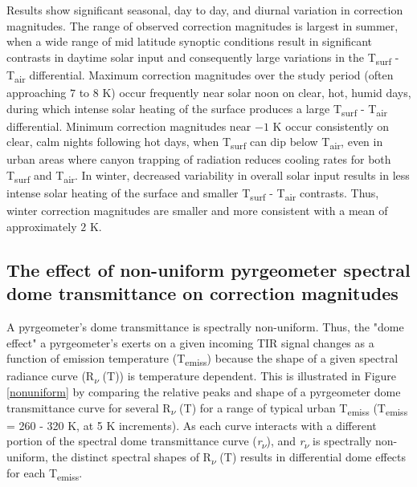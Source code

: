 Results show significant seasonal, day to day, and diurnal variation in correction magnitudes. The range of observed correction magnitudes is largest in summer, when a wide range of mid latitude synoptic conditions result in significant contrasts in daytime solar input and consequently large variations in the T\textsubscript{surf} - T\textsubscript{air} differential. Maximum correction magnitudes over the study period (often approaching $7$ to $8$ \si{\kelvin}) occur frequently near solar noon on clear, hot, humid days, during which intense solar heating of the surface produces a large T\textsubscript{surf} - T\textsubscript{air} differential. Minimum correction magnitudes near $-1$ \si{\kelvin} occur consistently on clear, calm nights following hot days, when T\textsubscript{surf} can dip below T\textsubscript{air}, even in urban areas where canyon trapping of radiation reduces cooling rates for both T\textsubscript{surf} and T\textsubscript{air}. In winter, decreased variability in overall solar input results in less intense solar heating of the surface and smaller T\textsubscript{surf} - T\textsubscript{air} contrasts. Thus, winter correction magnitudes are smaller and more consistent with a mean of approximately $2$ \si{\kelvin}.

\subsection{The effect of non-uniform pyrgeometer spectral dome transmittance on correction magnitudes}\label{Persistence in correction magnitudes}

A pyrgeometer's dome transmittance is spectrally non-uniform. Thus, the "dome effect" a pyrgeometer's exerts on a given incoming TIR signal changes as a function of emission temperature (T\textsubscript{emiss}) because the shape of a given spectral radiance curve (R\textsubscript{$\nu$} (T)) is temperature dependent. This is illustrated in Figure \ref{nonuniform} by comparing the relative peaks and shape of a pyrgeometer dome transmittance curve for several R\textsubscript{$\nu$} (T) for a range of typical urban T\textsubscript{emiss} (T\textsubscript{emiss} = 260 - 320 \si{\kelvin}, at 5 \si{\kelvin} increments). As each curve interacts with a different portion of the spectral dome transmittance curve (\textit{r\textsubscript{$\nu$}}), and \textit{r\textsubscript{$\nu$}} is spectrally non-uniform, the distinct spectral shapes of R\textsubscript{$\nu$} (T) results in differential dome effects for each T\textsubscript{emiss}.

